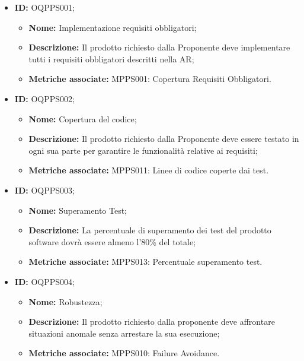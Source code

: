 \documentclass[openany,12pt,a4paper]{report}
\begin{document}
        
        \begin{itemize}
            \item \textbf{ID:} OQPPS001;
            \begin{itemize} 
            	\item \textbf{Nome:} Implementazione requisiti obbligatori;
            	\item \textbf{Descrizione:} Il prodotto richiesto dalla Proponente deve implementare tutti i requisiti obbligatori descritti nella AR;
            	\item \textbf{Metriche associate:} MPPS001: Copertura Requisiti Obbligatori.
            \end{itemize}
        \end{itemize}
        
        \begin{itemize}
            \item \textbf{ID:} OQPPS002;
            \begin{itemize} 
            	\item \textbf{Nome:} Copertura del codice;
            	\item \textbf{Descrizione:} Il prodotto richiesto dalla Proponente deve essere testato in ogni sua parte per garantire le funzionalità relative ai requisiti;
            	\item \textbf{Metriche associate:} MPPS011: Linee di codice coperte dai test.
            \end{itemize}
        \end{itemize} 
        
        \begin{itemize}
            \item \textbf{ID:} OQPPS003;
            \begin{itemize} 
            	\item \textbf{Nome:} Superamento Test;
            	\item \textbf{Descrizione:} La percentuale di superamento dei test del prodotto software dovrà essere almeno l'80\% del totale;
            	\item \textbf{Metriche associate:} MPPS013: Percentuale superamento test.
            \end{itemize}
        \end{itemize} 
        
        \begin{itemize}
            \item \textbf{ID:} OQPPS004;
            \begin{itemize} 
            	\item \textbf{Nome:} Robustezza;
            	\item \textbf{Descrizione:} Il prodotto richiesto dalla proponente deve affrontare situazioni anomale senza arrestare la sua esecuzione;
            	\item \textbf{Metriche associate:} MPPS010: Failure Avoidance.
            \end{itemize}
        \end{itemize}
        
\end{document}
